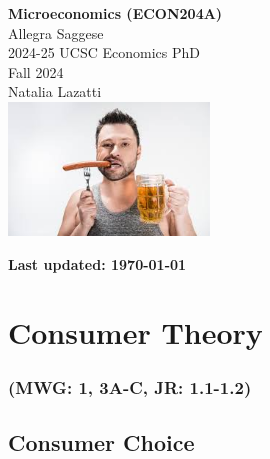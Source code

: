 \documentclass{article}
\begin{document}
\begin{titlepage}
    \centering
    \vspace*{1in} %
    {\LARGE \textbf{Microeconomics (ECON204A)}} \\[0.5cm]
    {\LARGE Allegra Saggese} \\ [.5cm]
    {\large 2024-25 UCSC Economics PhD} \\ [1.5 cm]
    {\large Fall 2024} \\[.25cm]
    {\large Natalia Lazatti} \\[1cm]
    \includegraphics[width=0.4\textwidth]{images/images.jpg} %
    \vfill
    \end{titlepage}

\clearpage
\pagestyle{empty} %
\noindent \textbf{Last updated: \today} 
\vspace{0.5cm} %
\tableofcontents
\clearpage %
\pagestyle{plain} %




\section{Consumer Theory}
\subsubsection*{(MWG: 1, 3A-C, JR: 1.1-1.2)}

\subsection{Consumer Choice} %
\end{document}
